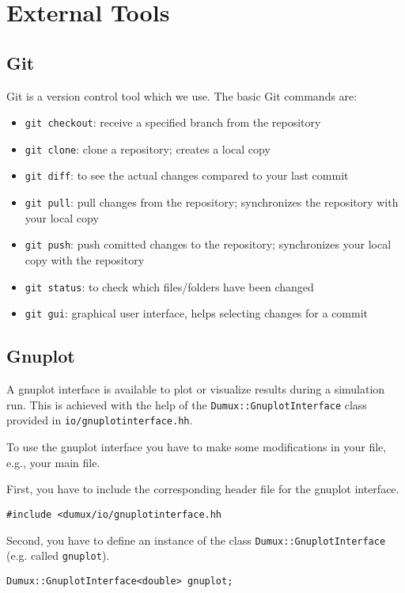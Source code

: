 \section{External Tools}
\label{sc_externaltools}

\subsection{Git}
Git is a version control tool which we use.
The basic Git commands are:
\begin{itemize}
  \item \texttt{git checkout}: receive a specified branch from the repository
  \item \texttt{git clone}: clone a repository; creates a local copy
  \item \texttt{git diff}: to see the actual changes compared to your last commit
  \item \texttt{git pull}: pull changes from the repository; synchronizes the
  repository with your local copy
  \item \texttt{git push}: push comitted changes to the repository;  synchronizes
  your local copy with the repository
  \item \texttt{git status}: to check which files/folders have been changed
  \item \texttt{git gui}: graphical user interface, helps selecting changes for
  a commit
\end{itemize}


\subsection{Gnuplot}
\label{gnuplot}
A gnuplot interface is available to plot or visualize results during a simulation run.
This is achieved with the help of the \texttt{Dumux::GnuplotInterface} class provided in \texttt{io/gnuplotinterface.hh}.

To use the gnuplot interface you have to make some modifications in your file, e.g., your main file.

First, you have to include the corresponding header file for the gnuplot interface.
\begin{lstlisting}[style=DumuxCode]
#include <dumux/io/gnuplotinterface.hh
\end{lstlisting}

Second, you have to define an instance of the class \texttt{Dumux::GnuplotInterface} (e.g. called \texttt{gnuplot}).
\begin{lstlisting}[style=DumuxCode]
Dumux::GnuplotInterface<double> gnuplot;
\end{lstlisting}

